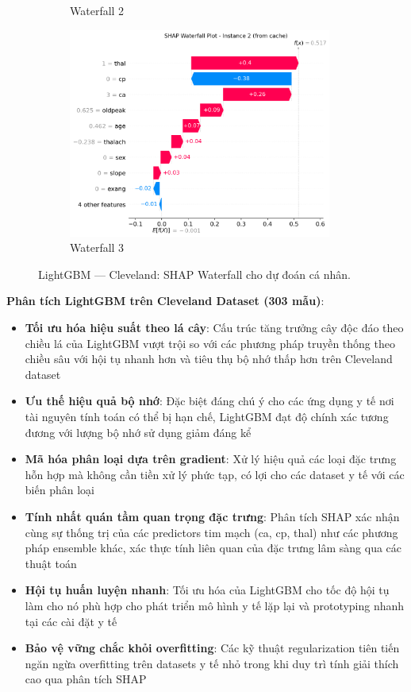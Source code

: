 \begin{figure}[H]
\begin{subfigure}[b]{0.31\textwidth}
\caption{Waterfall 2}
\label{fig:lgbm_clev_waterfall2}
\end{subfigure}\hfill
\begin{subfigure}[b]{0.31\textwidth}
\centering
\includegraphics[width=0.95\textwidth]{Result/cleveland_dataset/LightGBM/SHAP/Waterfall 3.png}
\caption{Waterfall 3}
\label{fig:lgbm_clev_waterfall3}
\end{subfigure}
\caption{LightGBM — Cleveland: SHAP Waterfall cho dự đoán cá nhân.}
\label{fig:lgbm_clev_waterfalls}
\end{figure}

\textbf{Phân tích LightGBM trên Cleveland Dataset (303 mẫu)}:
\begin{itemize}[leftmargin=*]
    \item \textbf{Tối ưu hóa hiệu suất theo lá cây}: Cấu trúc tăng trưởng cây độc đáo theo chiều lá của LightGBM vượt trội so với các phương pháp truyền thống theo chiều sâu với hội tụ nhanh hơn và tiêu thụ bộ nhớ thấp hơn trên Cleveland dataset
    \item \textbf{Ưu thế hiệu quả bộ nhớ}: Đặc biệt đáng chú ý cho các ứng dụng y tế nơi tài nguyên tính toán có thể bị hạn chế, LightGBM đạt độ chính xác tương đương với lượng bộ nhớ sử dụng giảm đáng kể
    \item \textbf{Mã hóa phân loại dựa trên gradient}: Xử lý hiệu quả các loại đặc trưng hỗn hợp mà không cần tiền xử lý phức tạp, có lợi cho các dataset y tế với các biến phân loại
    \item \textbf{Tính nhất quán tầm quan trọng đặc trưng}: Phân tích SHAP xác nhận cùng sự thống trị của các predictors tim mạch (ca, cp, thal) như các phương pháp ensemble khác, xác thực tính liên quan của đặc trưng lâm sàng qua các thuật toán
    \item \textbf{Hội tụ huấn luyện nhanh}: Tối ưu hóa của LightGBM cho tốc độ hội tụ làm cho nó phù hợp cho phát triển mô hình y tế lặp lại và prototyping nhanh tại các cài đặt y tế
    \item \textbf{Bảo vệ vững chắc khỏi overfitting}: Các kỹ thuật regularization tiên tiến ngăn ngừa overfitting trên datasets y tế nhỏ trong khi duy trì tính giải thích cao qua phân tích SHAP
\end{itemize}

